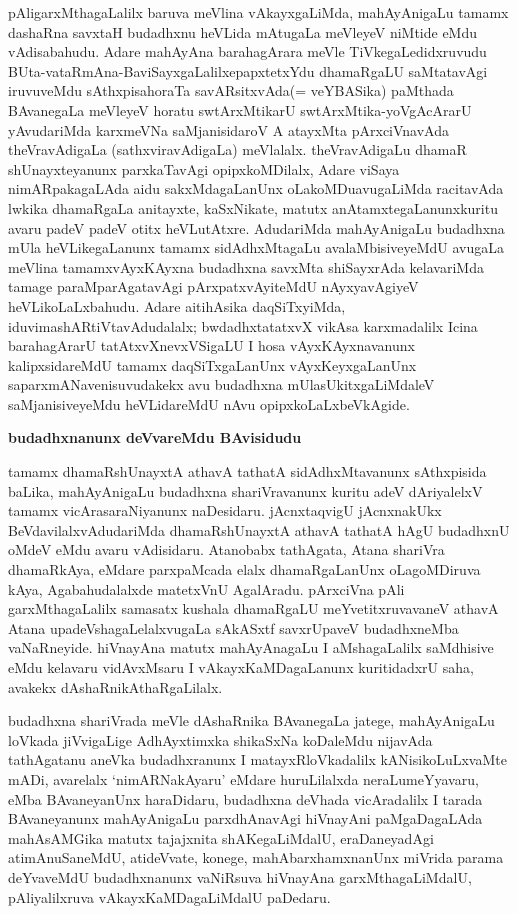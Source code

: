 pAligarxMthagaLalilx baruva meVlina vAkayxgaLiMda, mahAyAnigaLu tamamx dashaRna savxtaH budadhxnu heVLida mAtugaLa meVleyeV niMtide eMdu vAdisabahudu. Adare mahAyAna barahagArara meVle TiVkegaLedidxruvudu BUta-vataRmAna-BaviSayxgaLalilx\break epapxtetxYdu dhamaRgaLU saMtatavAgi iruvuveMdu sAthxpisahoraTa savARsitxvAda\break (= veYBASika) paMthada BAvanegaLa meVleyeV horatu swtArxMtikarU swtArxMtika-\-yoVgAcArarU yAvudariMda karxmeVNa saMjanisidaroV A atayxMta pArxciVnavAda theVravAdigaLa (sathxviravAdigaLa) meVlalalx. theVravAdigaLu dhamaR shUnayxteyanunx parxkaTa\-vAgi opipxkoMDilalx, Adare viSaya nimARpakagaLAda aidu sakxMdagaLanUnx oLakoMDu\break avugaLiMda racitavAda lwkika dhamaRgaLa anitayxte, kaSxNikate, matutx anAtamxtegaLanunx\break kuritu avaru padeV padeV otitx heVLutAtxre. AdudariMda mahAyAnigaLu \hbox{budadhxna} mUla heVLikegaLanunx tamamx sidAdhxMtagaLu avalaMbisiveyeMdU avugaLa meVlina tamamx\break vAyxKAyxna budadhxna savxMta shiSayxrAda kelavariMda tamage paraMparAgatavAgi pArxpatxvAyi\-teMdU nAyxyavAgiyeV heVLikoLaLxbahudu. Adare aitihAsika daqSiTxyiMda, idu\break vimashARtiVtavAdudalalx; bwdadhxtatatxvX vikAsa karxmadalilx Icina barahagArarU tatAtxvXnevxVSigaLU I hosa vAyxKAyxnavanunx kalipxsidareMdU tamamx daqSiTxgaLanUnx vAyxKeyxgaLanUnx saparx\-mANavenisuvudakekx avu budadhxna mUlasUkitxgaLiMdaleV saMjanisiveyeMdu heVLida\-reMdU nAvu opipxkoLaLxbeVkAgide.

\begin{center}
{\textbf{\Large budadhxnanunx deVvareMdu BAvisidudu}}
\end{center}

tamamx dhamaRshUnayxtA athavA tathatA sidAdhxMtavanunx sAthxpisida baLika, mahAyAnigaLu budadhxna shariVravanunx kuritu adeV dAriyalelxV tamamx vicArasaraNiyanunx naDesi\-daru. jAcnxtaqvigU jAcnxnakUkx BeVdavilalxvAdudariMda dhamaRshUnayxtA athavA tathatA hAgU budadhxnU oMdeV eMdu avaru vAdisidaru. Atanobabx tathAgata, Atana shariVra dhamaRkAya, eMdare parxpaMcada elalx dhamaRgaLanUnx oLagoMDiruva kAya, Agabahudalalxde matetxVnU AgalAradu. pArxciVna pAli garxMthagaLalilx samasatx kushala dhamaRgaLU meYvetitxruvavaneV athavA Atana upadeVshagaLelalxvugaLa sAkASxtf savxrUpaveV budadhxneMba vaNaRneyide. hiVnayAna matutx mahAyAnagaLu I aMshagaLalilx saMdhisive eMdu kelavaru vidAvxMsaru I vAkayxKaMDagaLanunx kuritidadxrU saha, avakekx dAshaRnikAthaR\-gaLilalx.

\newpage

budadhxna shariVrada meVle dAshaRnika BAvanegaLa jatege, mahAyAnigaLu loVkada jiVvigaLige AdhAyxtimxka shikaSxNa koDaleMdu nijavAda tathAgatanu aneVka budadhxranunx I matayxRloVkadalilx kANisikoLuLxvaMte mADi, avarelalx `nimARNakAyaru' eMdare huruLilalxda neraLumeYyavaru, eMba BAvaneyanUnx haraDidaru, budadhxna deVhada vicAradalilx I tarada BAvaneyanunx mahAyAnigaLu parxdhAnavAgi hiVnayAni paMgaDagaLAda mahAsAMGika matutx tajajxnita shAKegaLiMdalU, eraDaneyadAgi atimAnuSaneMdU, atideVvate, konege, mahAbarxhamxnanUnx miVrida parama deYvaveMdU budadhxnanunx vaNiRsuva hiVnayAna garxMthagaLiMdalU, pAliyalilxruva vAkayxKaMDagaLiMdalU paDedaru.

